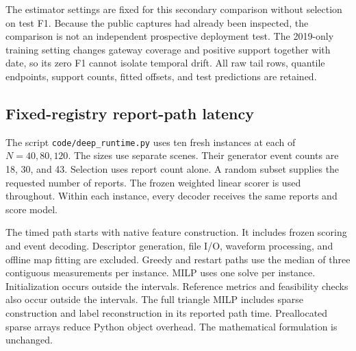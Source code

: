 \begin{table}[!htb]\caption{Clock fitting with unchanged public test reports. Reference support counts training payload matches. Metadata support counts lags in the fixed refinement neighborhood. Scorer fitting, gate calibration, and population selection remain reference-assisted. Both clock fits give identical test partitions.}\label{tab:deep_loed_clock}
\small\setlength{\tabcolsep}{3pt}\end{table}

The estimator settings are fixed for this secondary comparison without selection on test F1. Because the public captures had already been inspected, the comparison is not an independent prospective deployment test. The 2019-only training setting changes gateway coverage and positive support together with date, so its zero F1 cannot isolate temporal drift. All raw tail rows, quantile endpoints, support counts, fitted offsets, and test predictions are retained.
\FloatBarrier

\subsection{Fixed-registry report-path latency}
The script \texttt{code/deep\_runtime.py} uses ten fresh instances at each of $N=40,80,120$. The sizes use separate scenes. Their generator event counts are 18, 30, and 43. Selection uses report count alone. A random subset supplies the requested number of reports. The frozen weighted linear scorer is used throughout. Within each instance, every decoder receives the same reports and score model.

The timed path starts with native feature construction. It includes frozen scoring and event decoding. Descriptor generation, file I/O, waveform processing, and offline map fitting are excluded. Greedy and restart paths use the median of three contiguous measurements per instance. MILP uses one solve per instance. Initialization occurs outside the intervals. Reference metrics and feasibility checks also occur outside the intervals. The full triangle MILP includes sparse construction and label reconstruction in its reported path time. Preallocated sparse arrays reduce Python object overhead. The mathematical formulation is unchanged.

\begin{table}[!htb]\caption{Fresh fixed-registry report-path measurements. Each size uses ten independently seeded scenes. Median and maximum refer to instance-level path times. F1 averages ten scene values. The one-second cap applies to the solver only. Model construction is included in the reported path. Every MILP result is proven optimal.}\label{tab:deep_runtime}
\small\setlength{\tabcolsep}{3pt}\end{table}

